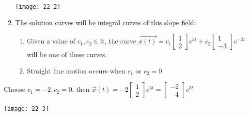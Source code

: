 \begin{enumerate}[label=\protect\circled{\Roman*}]
\begin{example-N}
\begin{enumerate}[label=\protect\circled{\alph*}]
\begin{enumerate}[label=\protect\circled{\arabic*}]
			\end{enumerate}
	\end{enumerate}
	\end{example-N}
		\begin{center}
			\texttt{[image: 22-2]}
		\end{center}
	\item The solution curves will be integral curves of this slope field:
	\begin{enumerate}[label=\protect\circled{\alph*}]
	\item Given a value of $c_1, c_2 \in \mathbb{R}$, the curve $\vec{x(t)} = c_1 \begin{bmatrix}
				1\\2
			\end{bmatrix} e^{3t} + c_2
			\begin{bmatrix}
				1\\-3
			\end{bmatrix} e^{-2t}$ will be one of these curves.
	\item Straight line motion occurs when $c_1$ or $c_2 = 0$ 
	\end{enumerate}
\end{enumerate}
Choose $c_1 = -2, c_2 = 0$. then $\vec{x}(t) = -2 \begin{bmatrix}
	1\\2
\end{bmatrix} e^{3t} = \begin{bmatrix}
	-2\\-4
\end{bmatrix}e^{3t}$
\begin{center}
	\texttt{[image: 22-3]}
\end{center}